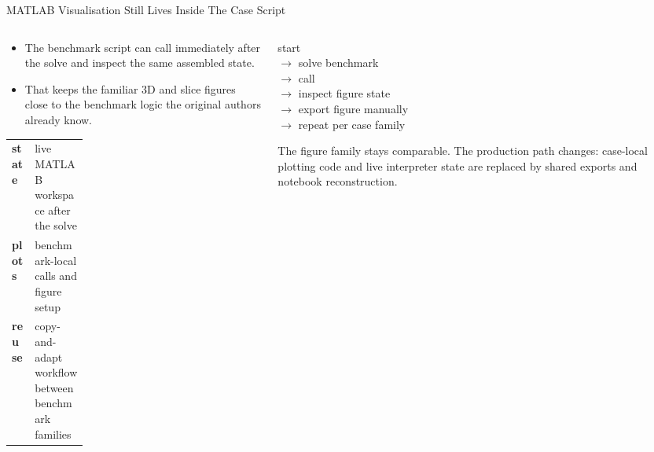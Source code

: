 \documentclass[aspectratio=169,10pt]{beamer}
\begin{document}
\begin{frame}{MATLAB Visualisation Still Lives Inside The Case Script}
\small
\begin{columns}[T,totalwidth=\textwidth]
\begin{column}{0.56\textwidth}
\begin{softbox}
\begin{itemize}
  \item The benchmark script can call  immediately after the solve and inspect the same assembled state.
  \item That keeps the familiar 3D and slice figures close to the benchmark logic the original authors already know.
\end{itemize}
\end{softbox}
\begin{softbox}
\begin{tabularx}{\linewidth}{p{0.30\linewidth}Y}
\textbf{state} & live MATLAB workspace after the solve \\
\textbf{plots} & benchmark-local  calls and figure setup \\
\textbf{reuse} & copy-and-adapt workflow between benchmark families \\
\end{tabularx}
\end{softbox}
\end{column}
\begin{column}{0.40\textwidth}
\begin{pseudobox}
start\\
$\rightarrow$ solve benchmark\\
\(\rightarrow\) call \\
\(\rightarrow\) inspect figure state\\
\(\rightarrow\) export figure manually\\
\(\rightarrow\) repeat per case family
\end{pseudobox}
\vspace{0.18cm}
\begin{callout}
The figure family stays comparable. The production path changes: case-local plotting code and live interpreter state are replaced by shared exports and notebook reconstruction.
\end{callout}
\end{column}
\end{columns}
\end{frame}
\end{document}
